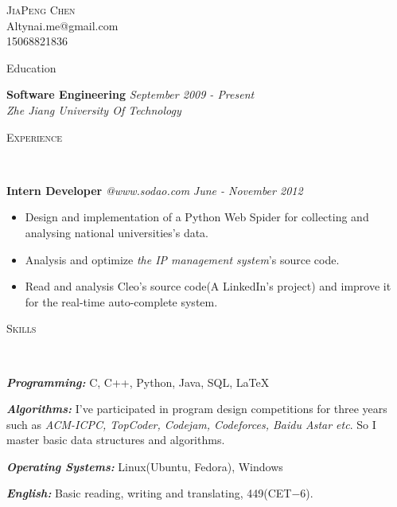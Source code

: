 ﻿\documentclass[9pt]{article}
\newenvironment{changemargin}[2]{%
  \begin{list}{}{%
    \setlength{\topsep}{0pt}%
    \setlength{\leftmargin}{#1}%
    \setlength{\rightmargin}{#2}%
    \setlength{\listparindent}{\parindent}%
    \setlength{\itemindent}{\parindent}%
    \setlength{\parsep}{\parskip}%
  }%
  \item[]}{\end{list}
}
\newcommand{\lineover}{
	\begin{changemargin}{-0.05in}{-0.05in}
		\vspace*{-8pt}
		\hrulefill \\
		\vspace*{-2pt}
	\end{changemargin}
}
\newcommand{\header}[1]{
	\begin{changemargin}{-0.5in}{-0.5in}
		\scshape{#1}\\
  	\lineover
	\end{changemargin}
}
\newcommand{\contact}[4]{
	\begin{changemargin}{-0.5in}{-0.5in}
		\begin{center}
			{\Large \scshape {#1}}\\ \smallskip
			{#2}\\ \smallskip
			{#3}\\ \smallskip
			{#4}\smallskip
		\end{center}
	\end{changemargin}
}
\newenvironment{body} {
	\vspace*{-16pt}
	\begin{changemargin}{-0.25in}{-0.5in}
  }	
	{\end{changemargin}
}
\begin{document}
\contact{JiaPeng Chen}{Altynai.me@gmail.com}{15068821836}

\header{Education}
\begin{body}
	\vspace{14pt}
	\textbf{Software Engineering} \hfill \emph{September 2009 - Present} \\
	\emph{Zhe Jiang University Of Technology}\\
\end{body}

\smallskip

\header{Experience}

\begin{body}
	\vspace{14pt}

	\textbf{Intern Developer} \emph{@www.sodao.com} \hfill \emph{June - November 2012}\\
	\vspace*{-4pt}
	\begin{itemize} \itemsep -0pt  %
		\item Design and implementation of a Python Web Spider for collecting and analysing national universities's data.
        \item Analysis and optimize \emph{the IP management system}'s source code.
        \item Read and analysis Cleo's source code(A LinkedIn's project) and improve it for the real-time auto-complete system.
	\end{itemize}

\end{body}

\smallskip


\header{Skills}

\begin{body}
	\vspace{14pt}
	\emph{\textbf{Programming:}}{} C, C++, Python, Java, SQL, \LaTeX \\
	\medskip

    \emph{\textbf{Algorithms:}}{} I've participated in program design competitions for three years such as \emph{ACM-ICPC,
TopCoder, Codejam, Codeforces, Baidu Astar etc}. So I master basic data structures and algorithms.\\
	\medskip

	\emph{\textbf{Operating Systems:}}{} Linux(Ubuntu, Fedora), Windows \\
    \medskip

    \emph{\textbf{English:}}{} Basic reading, writing and translating, 449(CET$-$6).\\
\end{body}
\end{document}
